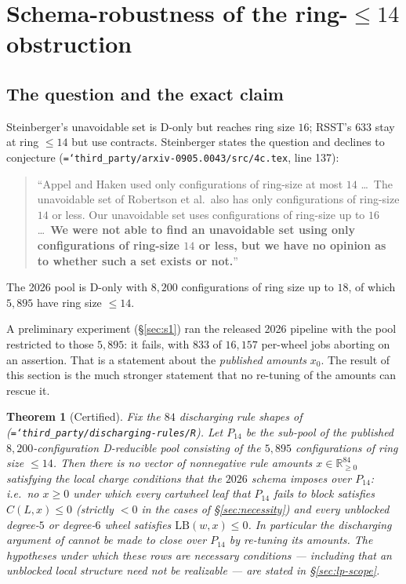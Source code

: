\documentclass[11pt]{article}
\newtheorem{theorem}{Theorem}[section]
\theoremstyle{definition}
\newcommand{\art}[1]{{\texttt{\hyphenchar\font=`\-\relax #1}}}
\begin{document}
\section{Schema-robustness of the ring-$\le 14$ obstruction}
\label{sec:lp}

\subsection{The question and the exact claim}

Steinberger's unavoidable set \cite{steinberger2010} is D-only but reaches ring size
$16$; RSST's $633$ stay at ring $\le 14$ but use contracts. Steinberger states the
question and declines to conjecture
(\art{third\_party/arxiv-0905.0043/src/4c.tex}, line 137):
\begin{quote}\small
``Appel and Haken used only configurations of ring-size at most $14$ \dots\ The
unavoidable set of Robertson et al.\ also has only configurations of ring-size $14$
or less. Our unavoidable set uses configurations of ring-size up to $16$ \dots\
\textbf{We were not able to find an unavoidable set using only configurations of
ring-size $14$ or less, but we have no opinion as to whether such a set exists or
not.}''
\end{quote}
The 2026 pool \cite{nl4ct2026} is D-only with $8{,}200$ configurations of ring size
up to $18$, of which $5{,}895$ have ring size $\le 14$.

A preliminary experiment (\S\ref{sec:s1}) ran the released 2026 pipeline with the
pool restricted to those $5{,}895$: it fails, with $833$ of $16{,}157$ per-wheel jobs
aborting on an assertion. That is a statement about the \emph{published amounts}
$x_0$. The result of this section is the much stronger statement that no re-tuning
of the amounts can rescue it.

\begin{theorem}[Certified]
\label{thm:lp}
Fix the $84$ discharging rule shapes of \cite{nl4ct2026}
(\art{third\_party/discharging-rules/R}). Let $P_{14}$ be the sub-pool of the
published $8{,}200$-configuration D-reducible pool consisting of the $5{,}895$
configurations of ring size $\le 14$. Then there is no vector of nonnegative rule
amounts $x \in \mathbb{R}^{84}_{\ge 0}$ satisfying the local charge conditions that
the $2026$ schema imposes over $P_{14}$: i.e.\ no $x\ge 0$ under which every
cartwheel leaf that $P_{14}$ fails to block satisfies $C(L,x)\le 0$ (strictly
$<0$ in the cases of \S\ref{sec:necessity}) and every unblocked degree-$5$ or
degree-$6$ wheel satisfies $\mathrm{LB}(w,x)\le 0$. In particular the discharging
argument of \cite{nl4ct2026} cannot be made to close over $P_{14}$ by re-tuning
its amounts. The hypotheses under which these rows are necessary conditions ---
including that an unblocked local structure need not be realizable --- are stated
in \S\ref{sec:lp-scope}.
\end{theorem}
\end{document}
